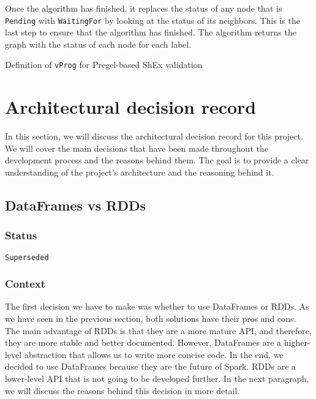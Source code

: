Once the algorithm has finished, it replaces the status of any node that is \texttt{Pending} with \texttt{WaitingFor} by looking at the status of its neighbors. This is the last step to ensure that the algorithm has finished. The algorithm returns the graph with the status of each node for each label.

\begin{pseudocode}
    
\end{pseudocode}

\begin{table}
    \centering
    
    \caption{Definition of \texttt{vProg} for Pregel-based ShEx validation}
\end{table}
\label{vProg}

\section{Architectural decision record}

In this section, we will discuss the architectural decision record for this project. We will cover the main decisions that have been made throughout the development process and the reasons behind them. The goal is to provide a clear understanding of the project's architecture and the reasoning behind it.

\subsection{DataFrames vs RDDs}

\subsubsection{Status}

\texttt{Superseded}

\subsubsection{Context}

The first decision we have to make was whether to use DataFrames or RDDs. As we have seen in the previous section, both solutions have their pros and cons. The main advantage of RDDs is that they are a more mature API, and therefore, they are more stable and better documented. However, DataFrames are a higher-level abstraction that allows us to write more concise code. In the end, we decided to use DataFrames because they are the future of Spark. RDDs are a lower-level API that is not going to be developed further. In the next paragraph, we will discuss the reasons behind this decision in more detail.

